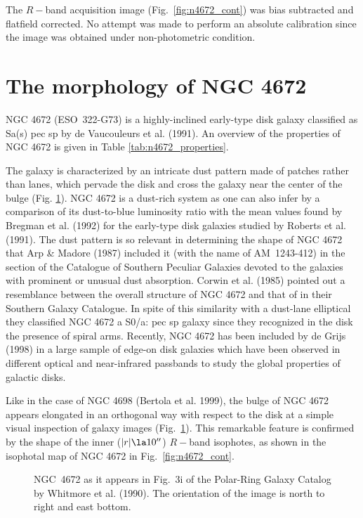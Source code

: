 \documentclass[twocolumns]{aa}
\begin{document}
The $R-$band acquisition image (Fig.~\ref{fig:n4672_cont}) was bias
subtracted and fla\-tfield corrected.  No attempt was made to perform
an absolute calibration since the image was obtained under
non-photome\-tric condition.


\section{The morphology of NGC 4672}
\label{sec:n4672_morphology}

NGC 4672 (ESO~322-G73) is a highly-inclined early-type disk galaxy
classified  as Sa(s) pec sp by de Vaucouleurs et al. (1991). An
overview of  the properties of NGC 4672 is given in Table
\ref{tab:n4672_properties}.

The galaxy is characterized by an intricate dust pattern ma\-de of
patches rather than lanes, which pervade the disk and cross the galaxy
near the center of the bulge  (Fig. \ref{fig:n4672_whitmore}).
NGC 4672 is a dust-rich system as one can also infer by a
comparison of its dust-to-blue luminosity ratio with the mean values
found by Bregman et al. (1992) for the early-type disk galaxies
studied by Roberts et al. (1991).  The dust pattern is so relevant in
determining the shape of NGC 4672 that Arp \& Madore (1987) included
it (with the name of AM~1243-412) in the section of the Catalogue of
Southern Peculiar Galaxies devoted to the galaxies with prominent
or unusual dust absorption.  Corwin et al. (1985) pointed out a
resemblance between the overall structure of NGC 4672 and that of
 in their Southern Galaxy Catalogue. In spite of this
similarity with a dust-lane elliptical they classified NGC 4672 a
S0/a: pec sp galaxy since they recognized in the disk the presence of
spiral arms.  Recently, NGC 4672 has been included by de Grijs
(1998) in a large sample of edge-on disk galaxies which have been
observed in different optical and near-infrared passbands to study the
global properties of galactic disks.

Like in the case of NGC 4698 (Bertola et al. 1999), the bulge of
NGC 4672 appears elongated in an orthogonal way with respect to the
disk at a simple visual inspection of galaxy images 
(Fig.~\ref{fig:n4672_whitmore}). This remarkable feature is confirmed
by the shape of the inner ($|r|\la10''$) $R-$band isophotes, as shown
in the isophotal map of NGC 4672 in Fig.~\ref{fig:n4672_cont}.


\begin{figure}[ht]
\vspace*{11cm}
\caption[]{NGC~4672 as it appears in Fig.~3i of the Polar-Ring
  Galaxy Catalog by Whitmore et al. (1990). The orientation of the 
  image is north to right and east bottom.}
\label{fig:n4672_whitmore}
\end{figure}
\end{document}
